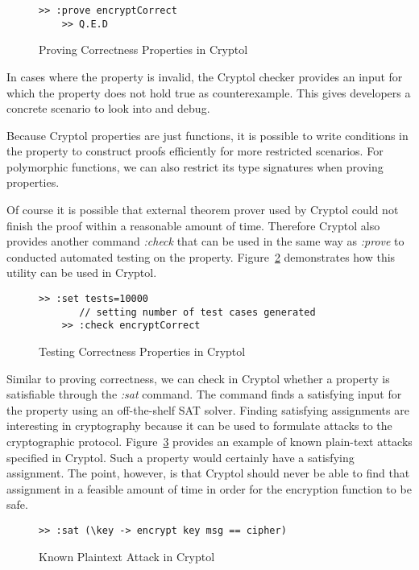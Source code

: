 \documentclass[a4paper, notitlepage]{report}
\begin{document}
\begin{figure}
  \begin{lstlisting}[frame=single]
    >> :prove encryptCorrect
    >> Q.E.D
  \end{lstlisting}
  \caption{Proving Correctness Properties in Cryptol}
  \label{fig:prove}
\end{figure}

In cases where the property is invalid, the Cryptol checker provides an input
for which the property does not hold true as counterexample. This gives developers
a concrete scenario to look into and debug.

Because Cryptol properties are just functions, it is possible to write conditions
in the property to construct proofs efficiently for more restricted scenarios.
For polymorphic functions, we can also restrict its type signatures when
proving properties.

Of course it is possible that external theorem prover used by Cryptol could
not finish the proof within a reasonable amount of time. Therefore Cryptol
also provides another command \emph{:check} that can be used in the same way
as \emph{:prove} to conducted automated testing on the property. Figure~\ref{fig:test}
demonstrates how this utility can be used in Cryptol.

\begin{figure}
  \begin{lstlisting}[frame=single]
    >> :set tests=10000
       // setting number of test cases generated 
    >> :check encryptCorrect
  \end{lstlisting}
  \caption{Testing Correctness Properties in Cryptol}
  \label{fig:test}
\end{figure}

Similar to proving correctness, we can check in Cryptol whether a property is
satisfiable through the \emph{:sat} command. The command finds a satisfying input
for the property using an off-the-shelf SAT solver. 
Finding satisfying assignments are interesting in cryptography because it can
be used to formulate attacks to the cryptographic protocol. Figure~\ref{fig:sat}
provides an example of known plain-text attacks specified in Cryptol.
Such a property would certainly have a satisfying assignment. The point, however,
is that Cryptol should never be able to find that assignment in a feasible amount
of time in order for the encryption function to be safe.

\begin{figure}
  \begin{lstlisting}[frame=single]
    >> :sat (\key -> encrypt key msg == cipher)
  \end{lstlisting}
  \caption{Known Plaintext Attack in Cryptol}
  \label{fig:sat}
\end{figure}
\end{document}
